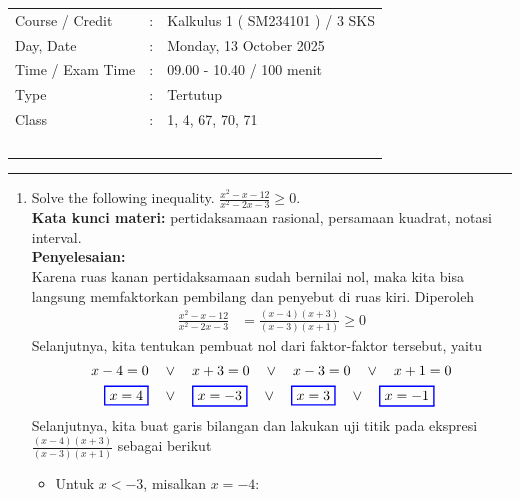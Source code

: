 \documentclass[10pt,openany,a4paper]{article}
\theoremstyle{definition}
\theoremstyle{definition}
\theoremstyle{plain}
\newenvironment{jawab}[2][tes]{
\textbf{Kata kunci materi:} #1.\\
\textbf{Penyelesaian:} #2
}{}
\begin{document}
    \begin{center}
	\begin{tabular}{lcl}
		Course / Credit & : & Kalkulus 1 ( SM234101 ) / 3 SKS\\
		Day, Date & : & Monday, 13 October 2025\\
		Time / Exam Time & : & 09.00 - 10.40 / 100 menit\\
		Type & : & Tertutup\\
		Class & : & 1, 4, 67, 70, 71\\
  ~
	\end{tabular}
    
    \noindent\rule{\textwidth}{2.pt}
        \end{center}
\begin{enumerate}
           \item Solve the following inequality.
    \( \frac{x^2 - x - 12}{x^2 - 2x - 3} \ge 0. \)\\
    \begin{jawab}[pertidaksamaan rasional, persamaan kuadrat, notasi interval]{~\\
    Karena ruas kanan pertidaksamaan sudah bernilai nol, maka kita bisa langsung memfaktorkan pembilang dan penyebut di ruas kiri. Diperoleh
    \begin{align*}
        \frac{x^2 - x - 12}{x^2 - 2x - 3} &= \frac{(x-4)(x+3)}{(x-3)(x+1)} \ge 0
    \end{align*}
    Selanjutnya, kita tentukan pembuat nol dari faktor-faktor tersebut, yaitu
    \begin{align*}
        x-4 = 0 \quad &\vee\quad x+3 = 0 \quad \vee\quad x-3 = 0 \quad \vee\quad x+1 = 0\\
        \colorlet{oldcolor}{.}
        \color{blue}
        \setlength{\fboxrule}{1pt} \boxed{\color{oldcolor}x=4}\color{oldcolor} \quad &\vee\quad \colorlet{oldcolor}{.}
        \color{blue}
        \setlength{\fboxrule}{1pt} \boxed{\color{oldcolor}x=-3}\color{oldcolor} \quad \vee\quad \colorlet{oldcolor}{.}
        \color{blue}
        \setlength{\fboxrule}{1pt} \boxed{\color{oldcolor}x=3}\color{oldcolor} \quad \vee\quad \colorlet{oldcolor}{.}
        \color{blue}
        \setlength{\fboxrule}{1pt} \boxed{\color{oldcolor}x=-1}\color{oldcolor}
    \end{align*}
    Selanjutnya, kita buat garis bilangan dan lakukan uji titik pada ekspresi \(\frac{(x-4)(x+3)}{(x-3)(x+1)}\) sebagai berikut
    \begin{itemize}
        \item Untuk \(x < -3\), misalkan \(x = -4\):

\end{itemize}}
\end{jawab}
\end{enumerate}
\end{document}
